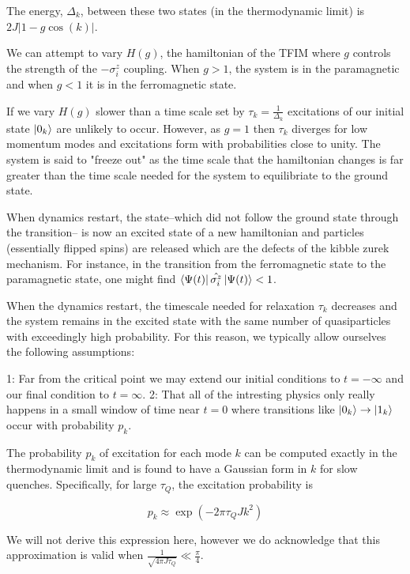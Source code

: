 \documentclass{article}
\begin{document}
The energy, $\Delta_k$, between these two states (in the thermodynamic limit) is $2J|1-g\cos(k)|$. 

We can attempt to vary $H(g)$, the hamiltonian of the TFIM where $g$ controls the strength of the $-\sigma^z_i$ coupling. When $g>1$, the system is in the paramagnetic and when $g<1$ it is in the ferromagnetic state.

If we vary $H(g)$ slower than a time scale set by $\tau_k=\frac{1}{\Delta_k}$ excitations of our initial state $\ket{0_k}$ are unlikely to occur. However, as $g=1$ then $\tau_k$ diverges for low momentum modes and excitations form with probabilities close to unity. The system is said to "freeze out" as the time scale that the hamiltonian changes is far greater than the time scale needed for the system to equilibriate to the ground state. 

When dynamics restart, the state--which did not follow the ground state through the transition-- is now an excited state of a new hamiltonian and particles (essentially flipped spins) are released which are the defects of the kibble zurek mechanism. For instance, in the transition from the ferromagnetic state to the paramagnetic state, one might find $ \bra{\Psi(t)} \hat{\sigma^z_i} \ket{\Psi(t)} < 1$.

When the dynamics restart, the timescale needed for relaxation $\tau_k$ decreases and the system remains in the excited state with the same number of quasiparticles with exceedingly high probability. For this reason, we typically allow ourselves the following assumptions:

1: Far from the critical point we may extend our initial conditions to $t=-\infty$ and our final condition to $t=\infty$.
2: That all of the intresting physics only really happens in a small window of time near $t=0$ where transitions like $\ket{0_k} \to \ket{1_k}$ occur with probability $p_k$.


The probability $p_k$ of excitation for each mode $k$ can be computed exactly in the thermodynamic limit and is found to have a Gaussian form in $k$ for slow quenches. Specifically, for large $\tau_Q$, the excitation probability is

\begin{equation}
    p_k \approx \exp\left(-2\pi  \tau_Q J k^2 \right)
\end{equation}

We will not derive this expression here, however we do acknowledge that this approximation is valid when $\frac{1}{\sqrt{4\pi J \tau_Q}} \ll \frac{\pi}{4}$.
\end{document}
